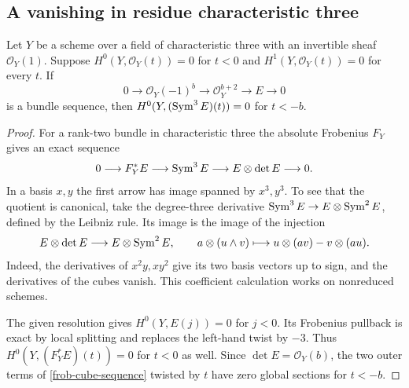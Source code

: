 \subsection{A vanishing in residue characteristic three}
\begin{lemma}\label{frobcube}
Let $Y$ be a scheme over a field of characteristic three with an invertible sheaf $\mathcal O_Y(1)$. Suppose
$H^0(Y,\mathcal O_Y(t))=0$ for $t<0$ and
$H^1(Y,\mathcal O_Y(t))=0$ for every $t$. If
\[
 0\longrightarrow\mathcal O_Y(-1)^b\longrightarrow
 \mathcal O_Y^{b+2}\longrightarrow E\longrightarrow0
\]
is a bundle sequence, then $H^0(Y,(\operatorname{Sym}^3 E)(t))=0$ for $t<-b$.
\end{lemma}
\begin{proof}
For a rank-two bundle in characteristic three the absolute Frobenius $F_Y$ gives an exact sequence
\begin{equation}\label{frob-cube-sequence}
 0\longrightarrow F_Y^*E\longrightarrow\operatorname{Sym}^3 E
 \longrightarrow E\otimes\det E\longrightarrow0 .
\end{equation}
In a basis $x,y$ the first arrow has image spanned by $x^3,y^3$. To see that the quotient is canonical, take the degree-three derivative
$\operatorname{Sym}^3 E\to E\otimes\operatorname{Sym}^2 E$, defined by the Leibniz rule. Its image is the image of the injection
\[
 E\otimes\det E\longrightarrow E\otimes\operatorname{Sym}^2 E,\qquad
 a\otimes(u\wedge v)\longmapsto u\otimes(av)-v\otimes(au).
\]
Indeed, the derivatives of $x^2y,xy^2$ give its two basis vectors up to sign, and the derivatives of the cubes vanish. This coefficient calculation works on nonreduced schemes.

The given resolution gives $H^0(Y,E(j))=0$ for $j<0$. Its Frobenius pullback is exact by local splitting and replaces the left-hand twist by $-3$. Thus $H^0(Y,(F_Y^*E)(t))=0$ for $t<0$ as well. Since $\det E=\mathcal O_Y(b)$, the two outer terms of \eqref{frob-cube-sequence} twisted by $t$ have zero global sections for $t<-b$.
\end{proof}

